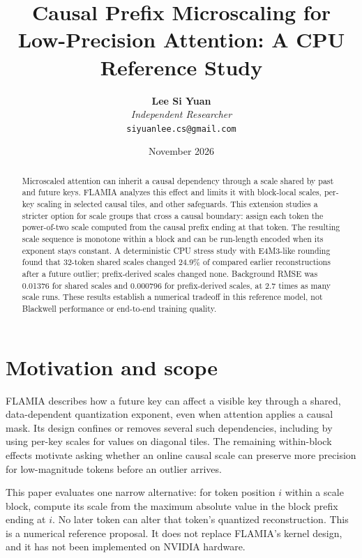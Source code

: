 \documentclass[10pt,twocolumn]{article}
\title{\textbf{Causal Prefix Microscaling for Low-Precision Attention: A CPU Reference Study}}
\author{\textbf{Lee Si Yuan}\\\textit{Independent Researcher}\\\texttt{siyuanlee.cs@gmail.com}}
\date{November 2026}
\begin{document}
\maketitle

\begin{abstract}
Microscaled attention can inherit a causal dependency through a scale shared by past and future keys. FLAMIA analyzes this effect and limits it with block-local scales, per-key scaling in selected causal tiles, and other safeguards. This extension studies a stricter option for scale groups that cross a causal boundary: assign each token the power-of-two scale computed from the causal prefix ending at that token. The resulting scale sequence is monotone within a block and can be run-length encoded when its exponent stays constant. A deterministic CPU stress study with E4M3-like rounding found that 32-token shared scales changed 24.9\% of compared earlier reconstructions after a future outlier; prefix-derived scales changed none. Background RMSE was 0.01376 for shared scales and 0.000796 for prefix-derived scales, at 2.7 times as many scale runs. These results establish a numerical tradeoff in this reference model, not Blackwell performance or end-to-end training quality.
\end{abstract}

\section{Motivation and scope}
FLAMIA describes how a future key can affect a visible key through a shared, data-dependent quantization exponent, even when attention applies a causal mask. Its design confines or removes several such dependencies, including by using per-key scales for values on diagonal tiles. The remaining within-block effects motivate asking whether an online causal scale can preserve more precision for low-magnitude tokens before an outlier arrives.

This paper evaluates one narrow alternative: for token position $i$ within a scale block, compute its scale from the maximum absolute value in the block prefix ending at $i$. No later token can alter that token's quantized reconstruction. This is a numerical reference proposal. It does not replace FLAMIA's kernel design, and it has not been implemented on NVIDIA hardware.
\end{document}
